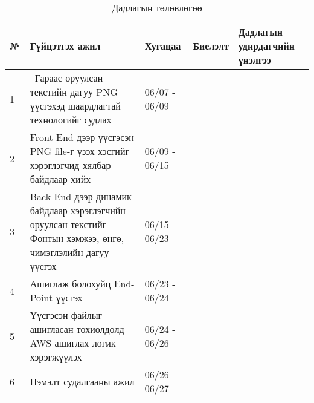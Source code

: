 \begin{table}[h]
	\caption{Дадлагын төлөвлөгөө}
	\begin{tabular}{|p{0.5cm}|p{8cm}|l|l|p{3cm}|}
	\hline
	\textbf{№} & \textbf{Гүйцэтгэх ажил} & \textbf{Хугацаа} & \textbf{Биелэлт} & \textbf{Дадлагын удирдагчийн үнэлгээ} \\ \hline
	1 &  Гараас оруулсан текстийн дагуу PNG үүсгэхэд шаардлагтай технологийг судлах & 06/07 - 06/09 && \\ \hline
	2 & Front-End дээр үүсгэсэн PNG file-г үзэх хэсгийг хэрэглэгчид хялбар байдлаар хийх & 06/09 - 06/15 && \\ \hline
	3 & Back-End дээр динамик байдлаар хэрэглэгчийн оруулсан текстийг Фонтын хэмжээ, өнгө, чимэглэлийн дагуу үүсгэх & 06/15 - 06/23 && \\ \hline
	4 & Ашиглаж болохуйц End-Point үүсгэх & 06/23 - 06/24 && \\ \hline
	5 & Үүсгэсэн файлыг ашигласан тохиолдолд AWS ашиглах логик хэрэгжүүлэх & 06/24 - 06/26 && \\ \hline
	6 & Нэмэлт судалгааны ажил & 06/26 - 06/27 && \\ \hline

	\end{tabular}
	\end{table}